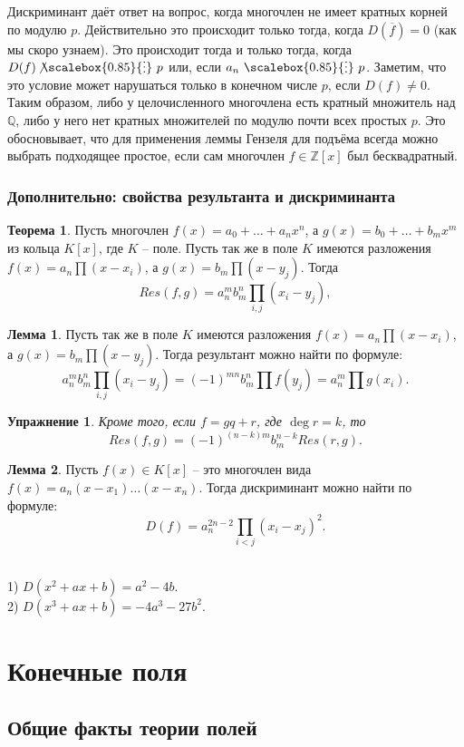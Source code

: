 \documentclass[12pt,a4paper,oneside]{book}
\newtheorem{uprz}{\color{violet!100!black} Упражнение}
\theoremstyle{definition}
\newtheorem{thm}{\color{red!40!black}Теорема}
\newtheorem{lem}{\color{green!50!black}Лемма}
\newcommand{\ovl}{\overline}
\newcommand{\di}{\mathop{\,\scalebox{0.85}{\raisebox{-1.2pt}[0.5\height]{\vdots}}\,}}
\newcommand{\ndi}{\mathop{\not\scalebox{0.85}{\raisebox{-1.2pt}[0.5\height]{\vdots}}\,}}
\newcommand{\Z}{\mathbb Z}
\newcommand{\Q}{\mathbb Q}
\def\exm{\noindent {\bf Примеры:}}
\def\thrm{\begin{thm}}
\def\ethrm{\end{thm}}
\def\lm{\begin{lem}}
\def\elm{\end{lem}}
\def\upr{\begin{uprz}}
\def\eupr{\end{uprz}}
\begin{document}
Дискриминант даёт ответ на вопрос, когда многочлен не имеет кратных корней по модулю $p$. Действительно это происходит только тогда, когда $D(\ovl{f})=0$ (как мы скоро узнаем). Это происходит тогда и только тогда, когда $D(f)\ndi p$ или, если $a_n\di p$. Заметим, что это условие может нарушаться только в конечном числе $p$, если $D(f)\neq 0$. Таким образом, либо у целочисленного многочлена есть кратный множитель над $\Q$, либо у него нет кратных множителей по модулю почти всех простых $p$. Это обосновывает, что для применения леммы Гензеля для подъёма всегда можно выбрать подходящее простое, если сам многочлен $f\in \Z[x]$ был бесквадратный.


\subsection{Дополнительно: свойства результанта и дискриминанта}

\thrm Пусть многочлен $f(x)=a_0+\dots+a_nx^n$, а $g(x)=b_0+\dots+b_mx^m$ из кольца $K[x]$, где $K$ -- поле. Пусть так же в поле $K$ имеются разложения $f(x)=a_n\prod(x-x_i)$, а $g(x)=b_m\prod (x-y_j)$. Тогда
$$Res(f,g)=a_n^mb_m^n \prod_{i,j} (x_i-y_j),$$
\ethrm

\lm Пусть так же в поле $K$ имеются разложения $f(x)=a_n\prod(x-x_i)$, а $g(x)=b_m\prod (x-y_j)$. Тогда результант можно найти по формуле:
$$a_n^mb_m^n \prod_{i,j} (x_i-y_j)=(-1)^{mn}b_m^n \prod f(y_j)=a_n^m \prod g(x_i).$$ 
\elm

\upr Кроме того, если $f=gq+r$, где $\deg r=k$, то 
 $$Res(f,g)=(-1)^{(n-k)m}b_m^{n-k} Res(r,g).$$
\eupr

\lm Пусть $f(x)\in K[x]$ -- это многочлен вида $f(x)=a_n(x-x_1)\dots(x-x_n)$. Тогда дискриминант можно найти по формуле:
$$D(f)=a_n^{2n-2}\prod_{i< j} (x_i-x_j)^2.$$
\elm

\exm\\
1) $D(x^2+ax+b)=a^2-4b$.\\
2) $D(x^3+ax+b)=-4a^3-27b^2$.\\






\chapter{Конечные поля}

\section{Общие факты теории полей}
\end{document}
